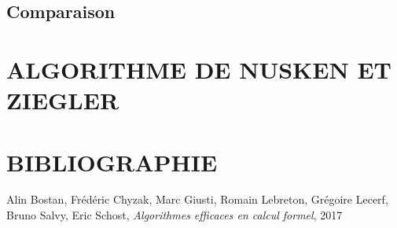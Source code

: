 \documentclass[a4paper]{article}
\begin{document}
\subsection{Comparaison}


\section{ALGORITHME DE NUSKEN ET ZIEGLER}

\cite{NuskenZiegler2004}


\newpage
\section{BIBLIOGRAPHIE}




\begin{thebibliography}{10}
     Alin Bostan, Frédéric Chyzak, Marc Giusti, Romain Lebreton, Grégoire Lecerf, Bruno Salvy, Eric Schost,
    \emph{Algorithmes efficaces en calcul formel}, 2017

\end{thebibliography}
\end{document}

